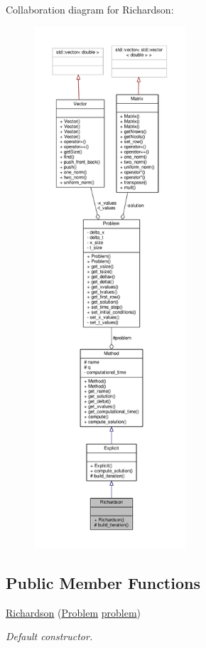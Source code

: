 Collaboration diagram for Richardson\+:
\nopagebreak
\begin{figure}[H]
\begin{center}
\leavevmode
\includegraphics[height=550pt]{classRichardson__coll__graph}
\end{center}
\end{figure}
\subsection*{Public Member Functions}
\begin{DoxyCompactItemize}
\item 
\hyperlink{classRichardson_ad1e05d535f45e14ee4debd6fde13565c}{Richardson} (\hyperlink{classProblem}{Problem} \hyperlink{classMethod_a29a08a679b5d30a8c813766308205041}{problem})
\begin{DoxyCompactList}\small\item\em Default constructor. \end{DoxyCompactList}\end{DoxyCompactItemize}
